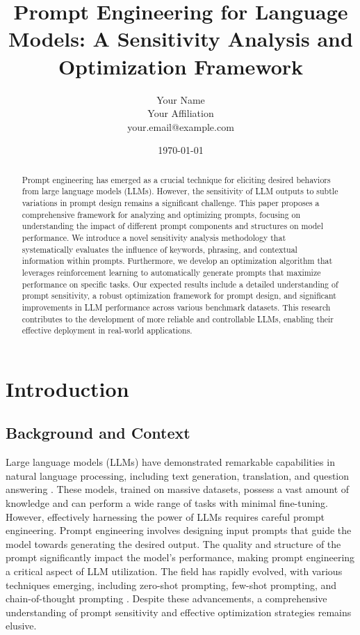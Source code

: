 \documentclass{article}
\title{Prompt Engineering for Language Models: A Sensitivity Analysis and Optimization Framework}
\author{Your Name \\ Your Affiliation \\ your.email@example.com}
\date{\today}
\begin{document}
\maketitle

\begin{abstract}
Prompt engineering has emerged as a crucial technique for eliciting desired behaviors from large language models (LLMs). However, the sensitivity of LLM outputs to subtle variations in prompt design remains a significant challenge. This paper proposes a comprehensive framework for analyzing and optimizing prompts, focusing on understanding the impact of different prompt components and structures on model performance. We introduce a novel sensitivity analysis methodology that systematically evaluates the influence of keywords, phrasing, and contextual information within prompts. Furthermore, we develop an optimization algorithm that leverages reinforcement learning to automatically generate prompts that maximize performance on specific tasks. Our expected results include a detailed understanding of prompt sensitivity, a robust optimization framework for prompt design, and significant improvements in LLM performance across various benchmark datasets. This research contributes to the development of more reliable and controllable LLMs, enabling their effective deployment in real-world applications.
\end{abstract}

\section{Introduction}

\subsection{Background and Context}
Large language models (LLMs) have demonstrated remarkable capabilities in natural language processing, including text generation, translation, and question answering \cite{vaswani2017attention, brown2020language}. These models, trained on massive datasets, possess a vast amount of knowledge and can perform a wide range of tasks with minimal fine-tuning. However, effectively harnessing the power of LLMs requires careful prompt engineering. Prompt engineering involves designing input prompts that guide the model towards generating the desired output. The quality and structure of the prompt significantly impact the model's performance, making prompt engineering a critical aspect of LLM utilization. The field has rapidly evolved, with various techniques emerging, including zero-shot prompting, few-shot prompting, and chain-of-thought prompting \cite{wei2022chain}. Despite these advancements, a comprehensive understanding of prompt sensitivity and effective optimization strategies remains elusive.
\end{document}
